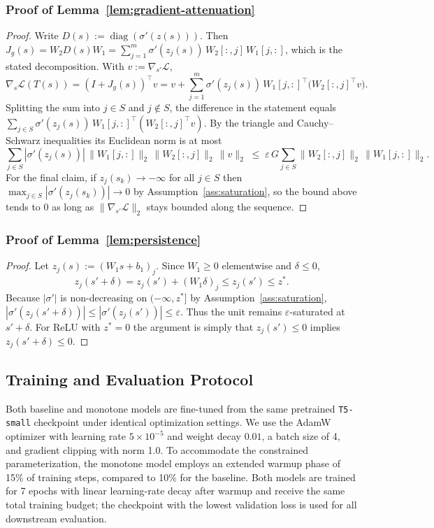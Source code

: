 \documentclass{article}
\theoremstyle{plain}
\theoremstyle{definition}
\theoremstyle{remark}
\begin{document}
\subsubsection{Proof of Lemma~\ref{lem:gradient-attenuation}}
\label{prf:atten}
\begin{proof}
Write $D(s) := \operatorname{diag}(\sigma'(z(s)))$. Then
$J_g(s) = W_2 D(s) W_1 = \sum_{j=1}^m \sigma'(z_j(s))\, W_2[:,j]\, W_1[j,:]$, which is
the stated decomposition. With $v := \nabla_{s'}\mathcal{L}$,
\[
\nabla_s \mathcal{L}(T(s)) = (I + J_g(s))^\top v
= v + \sum_{j=1}^m \sigma'(z_j(s))\, W_1[j,:]^\top \bigl(W_2[:,j]^\top v\bigr).
\]
Splitting the sum into $j \in S$ and $j \notin S$, the difference in the statement
equals $\sum_{j\in S} \sigma'(z_j(s))\, W_1[j,:]^\top (W_2[:,j]^\top v)$. By the
triangle and Cauchy--Schwarz inequalities its Euclidean norm is at most
\[
\sum_{j\in S} |\sigma'(z_j(s))|\, \|W_1[j,:]\|_2\, \|W_2[:,j]\|_2\, \|v\|_2
\;\le\; \varepsilon\, G \sum_{j\in S} \|W_2[:,j]\|_2\, \|W_1[j,:]\|_2 .
\]
For the final claim, if $z_j(s_k) \to -\infty$ for all $j \in S$ then
$\max_{j\in S}|\sigma'(z_j(s_k))| \to 0$ by Assumption~\ref{ass:saturation}, so
the bound above tends to $0$ as long as $\|\nabla_{s'}\mathcal{L}\|_2$ stays bounded
along the sequence.
\end{proof}

\subsubsection{Proof of Lemma~\ref{lem:persistence}}
\label{prf:persis}
\begin{proof}
Let $z_j(s) := (W_1 s + b_1)_j$. Since $W_1\ge 0$ elementwise and $\delta\le 0$,
\[
z_j(s' + \delta) = z_j(s') + (W_1 \delta)_j \le z_j(s') \le z^\ast .
\]
Because $|\sigma'|$ is non-decreasing on $(-\infty, z^\ast]$ by
Assumption~\ref{ass:saturation}, $|\sigma'(z_j(s'+\delta))| \le |\sigma'(z_j(s'))|
\le \varepsilon$. Thus the unit remains $\varepsilon$-saturated at $s'+\delta$.
For ReLU with $z^\ast = 0$ the argument is simply that $z_j(s') \le 0$ implies
$z_j(s'+\delta) \le 0$.
\end{proof}

\subsection{Training and Evaluation Protocol}
\label{app:training}
Both baseline and monotone models are fine-tuned from the same pretrained \texttt{T5-small} checkpoint under identical optimization settings. We use the AdamW optimizer with learning rate $5 \times 10^{-5}$ and weight decay $0.01$, a batch size of 4, and gradient clipping with norm 1.0. To accommodate the constrained parameterization, the monotone model employs an extended warmup phase of 15\% of training steps, compared to 10\% for the baseline. Both models are trained for 7 epochs with linear learning-rate decay after warmup and receive the same total training budget; the checkpoint with the lowest validation loss is used for all downstream evaluation.
\end{document}
